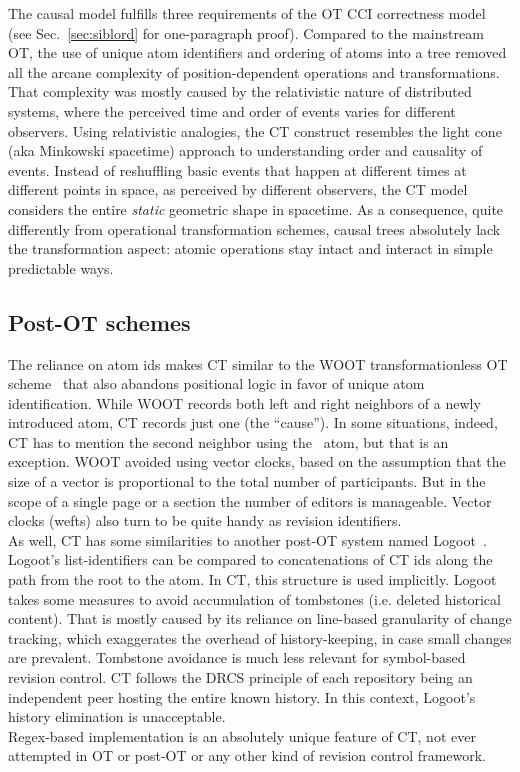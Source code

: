 \documentclass{sig-alternate}
\begin{document}
The causal model fulfills three requirements of the OT CCI correctness model (see Sec.~\ref{sec:siblord} for one-paragraph proof).
Compared to the mainstream OT, the use of unique atom identifiers and  ordering of atoms into a tree removed all the arcane complexity of position-dependent operations and transformations.
That complexity was mostly caused by the relativistic nature of distributed systems, where the perceived time and order of events varies for different observers.
Using relativistic analogies, the CT construct resembles the light cone (aka Minkowski spacetime) approach to understanding order and causality of events.
Instead of reshuffling basic events that happen at different times at different points in space, as perceived by different observers, the CT model considers the entire \emph{static} geometric shape in spacetime.
As a consequence, quite differently from operational transformation schemes, causal trees absolutely lack the transformation aspect: atomic operations stay intact and interact in simple predictable ways.

\subsection{Post-OT schemes}
The reliance on atom ids makes CT similar to the WOOT transformationless OT scheme~\cite{woot} that also abandons positional logic in favor of unique atom identification.
While WOOT records both left and right neighbors of a newly introduced atom, CT records just one (the ``cause''). 
In some situations, indeed, CT has to mention the second neighbor using the \zero ~atom, but that is an exception.
WOOT avoided using vector clocks, based on the assumption that the size of a vector is proportional to the total number of participants.
But in the scope of a single page or a section the number of editors is manageable. Vector clocks (wefts) also turn to be quite handy as revision identifiers. \\
As well, CT has some similarities to another post-OT system named Logoot~\cite{logoot}.
Logoot's list-identifiers can be compared to concatenations of CT ids along the path from the root to the atom.
In CT, this structure is used implicitly.
Logoot takes some measures to avoid accumulation of tombstones (i.e. deleted historical content). That is mostly caused by its reliance on line-based granularity of change tracking, which exaggerates the overhead of history-keeping, in case small changes are prevalent.
Tombstone avoidance is much less relevant for symbol-based revision control.
CT follows the DRCS principle of each repository being an independent peer hosting the entire known history.
In this context, Logoot's history elimination is unacceptable. \\
Regex-based implementation is an absolutely unique feature of CT, not ever attempted in OT or post-OT or any other kind of revision control framework.
\end{document}

